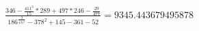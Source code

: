 \documentclass{article}
\begin{document}
\begin{align*}
  \frac{346 - \frac {411^3}   {15} * 289 + 497 * 246 - \frac {29} {477} }{186 ^ \frac {3} {431^2} - 378 ^ 2 + 145 - 361 - 52 } = 9345.443679495878
\end{align*}
\end{document}
